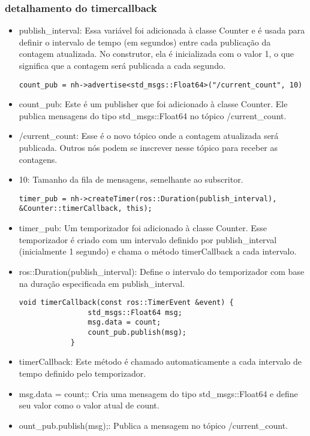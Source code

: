 \documentclass[letterpaper]{article}
\begin{document}
    \subsubsection{detalhamento do timercallback}
    \begin{itemize}
        \item publish\_interval: Essa variável foi adicionada à classe Counter e é usada para definir o intervalo de tempo (em segundos) entre cada publicação da contagem atualizada. No construtor, ela é inicializada com o valor 1, o que significa que a contagem será publicada a cada segundo.
        
        \begin{lstlisting}[style=cppStyle, title= Criação do Publisher count\_pub ]
            count_pub = nh->advertise<std_msgs::Float64>("/current_count", 10)    
        \end{lstlisting}
        
        \item count\_pub: Este é um publisher que foi adicionado à classe Counter. Ele publica mensagens do tipo std\_msgs::Float64 no tópico /current\_count.
        
        \item /current\_count: Esse é o novo tópico onde a contagem atualizada será publicada. Outros nós podem se inscrever nesse tópico para receber as contagens.
        
        \item 10: Tamanho da fila de mensagens, semelhante ao subscritor.
        
         \begin{lstlisting}[style=cppStyle, title= Criação do Publisher count\_pub ]
            timer_pub = nh->createTimer(ros::Duration(publish_interval), &Counter::timerCallback, this);
        \end{lstlisting}
        
        \item timer\_pub: Um temporizador foi adicionado à classe Counter. Esse temporizador é criado com um intervalo definido por publish\_interval (inicialmente 1 segundo) e chama o método timerCallback a cada intervalo.
        
        \item ros::Duration(publish\_interval): Define o intervalo do temporizador com base na duração especificada em publish\_interval.
         \begin{lstlisting}[style=cppStyle, title= Criação do Publisher count\_pub ]
            void timerCallback(const ros::TimerEvent &event) {
                std_msgs::Float64 msg;
                msg.data = count;
                count_pub.publish(msg);
            }
        \end{lstlisting}
        \item timerCallback: Este método é chamado automaticamente a cada intervalo de tempo definido pelo temporizador.
        \item msg.data = count;: Cria uma mensagem do tipo std\_msgs::Float64 e define seu valor como o valor atual de count.
        \item ount\_pub.publish(msg);: Publica a mensagem no tópico /current\_count.


\end{itemize}
\end{document}
